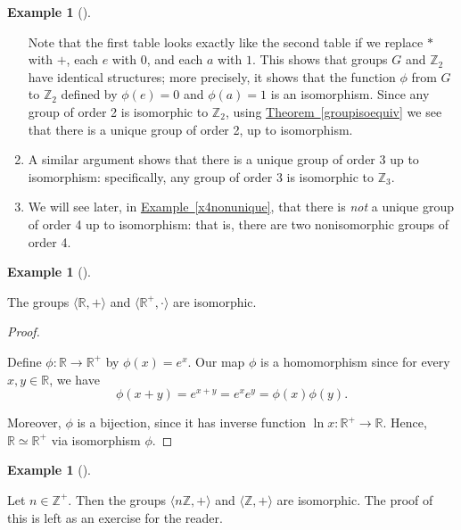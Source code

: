 \documentclass[10pt,]{book}
\theoremstyle{plain}
\theoremstyle{definition}
\theoremstyle{definition}
\theoremstyle{definition}
\newtheorem{example}[theorem]{Example}
\theoremstyle{definition}
\numberwithin{equation}{section}
\def\Z{\mathbb{Z}}
\def\R{\mathbb{R}}
\begin{document}
\begin{example}[]
\begin{enumerate}
Note that the first table looks exactly like the second table if we
            replace \(*\) with \(+\), each \(e\) with \(0\), and each \(a\) with \(1\). This
            shows that groups \(G\) and \(\Z_2\) have identical structures; more
            precisely, it shows that the function \(\phi\) from \(G\) to \(\Z_2\)
            defined by \(\phi(e)=0\) and \(\phi(a)=1\) is an isomorphism.  Since any
            group of order 2 is isomorphic to \(\Z_2\), using \hyperref[groupisoequiv]{Theorem~\ref{groupisoequiv}} we see that there is a unique group of order 2,
            up to isomorphism.
\item\hypertarget{li-149}{}
            A similar argument shows that there is a unique group of order 3 up to isomorphism: specifically, any group of order 3 is isomorphic to \(\Z_3\).
\item\hypertarget{li-150}{}
            We will see later, in \hyperref[x4nonunique]{Example~\ref{x4nonunique}}, that there is \emph{not} a unique group of order 4 up to isomorphism: that is, there are two nonisomorphic groups of order 4.
\end{enumerate}
\end{example}
\begin{example}[]\label{example-29}

        The groups \(\langle \R,+\rangle\) and \(\langle \R^+, \cdot\rangle\) are isomorphic.
\begin{proof}\hypertarget{proof-17}{}

        Define \(\phi:\R\to \R^+\) by \(\phi(x)=e^x\). Our map
        \(\phi\) is a homomorphism since for every \(x,y\in \R\), we have
\begin{equation*}

          \phi(x+y)=e^{x+y}=e^xe^y=\phi(x)\phi(y).
        
\end{equation*}

\par

        Moreover, \(\phi\) is a
        bijection, since it has inverse function \(\ln x: \R^+\to \R\).
        Hence, \(\R \simeq \R^+\) via isomorphism \(\phi\).
\end{proof}
\end{example}
\begin{example}[]\label{example-30}

        Let \(n\in \Z^+\). Then the groups \(\langle n\Z,+\rangle\) and \(\langle \Z,+\rangle\) are isomorphic. The proof of this is left as an exercise for the reader.
\end{example}
\par
\end{document}
